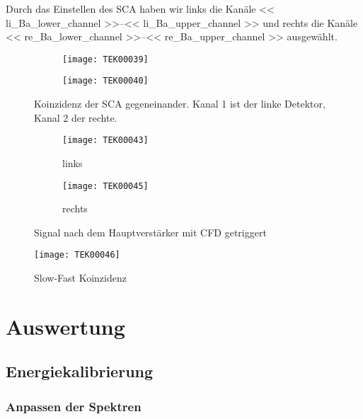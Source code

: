 \documentclass[11pt, ngerman, fleqn, DIV=15, headinclude, BCOR=2cm]{scrreprt}
\begin{document}
Durch das Einstellen des SCA haben wir links die Kanäle
\numrange{<< li_Ba_lower_channel >>}{<< li_Ba_upper_channel >>} und rechts
die Kanäle
\numrange{<< re_Ba_lower_channel >>}{<< re_Ba_upper_channel >>} ausgewählt.


\begin{figure}
	\centering
	\begin{subfigure}{0.49 \textwidth}
		\texttt{[image: TEK00039]}
	\end{subfigure}
	\begin{subfigure}{0.49 \textwidth}
		\texttt{[image: TEK00040]}
	\end{subfigure}
	\caption{%
		Koinzidenz der SCA gegeneinander. Kanal 1 ist der linke
		Detektor, Kanal 2 der rechte.
	}
	\label{fig:ba_slow_signal_sca_koinzidenz}
\end{figure}



\begin{figure}
	\centering
	\begin{subfigure}{0.49 \textwidth}
		\texttt{[image: TEK00043]}
		\caption{%
			links
		}
		\label{fig:ba_fast_signal_cfd_trig-li}
	\end{subfigure}
	\begin{subfigure}{0.49 \textwidth}
		\texttt{[image: TEK00045]}
		\caption{%
			rechts
		}
		\label{fig:ba_fast_signal_cfd_trig-re}
	\end{subfigure}
	\caption{%
		Signal nach dem Hauptverstärker mit CFD getriggert
	}
	\label{fig:ba_fast_signal_cfd_trig}
\end{figure}

\begin{figure}
	\centering
	\texttt{[image: TEK00046]}
	\caption{%
		Slow-Fast Koinzidenz
	}
	\label{fig:ba_slow_fast_koinzidenz}
\end{figure}

\fehlt%

\chapter{Auswertung}
\section{Energiekalibrierung}

\subsection{Anpassen der Spektren}
\end{document}
